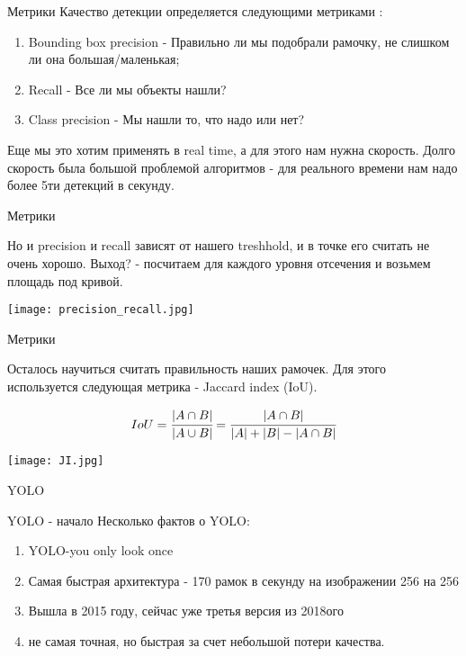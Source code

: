 \documentclass[notes,12pt, aspectratio=169]{beamer}
\newenvironment{transitionframe}{
  \setbeamercolor{background canvas}{bg=yellow}
  \begin{frame}}{
    \end{frame}
}
\begin{document}
\begin{frame}{Метрики}
Качество детекции определяется следующими метриками :
\begin{enumerate}
	\item Bounding box precision - Правильно ли мы подобрали рамочку, не слишком ли она большая/маленькая;
	\item Recall - Все ли мы объекты нашли?
	\item Class precision -  Мы нашли то, что надо или нет?
\end{enumerate}

Еще мы это хотим применять в real time, а для этого нам нужна скорость. Долго скорость была большой проблемой алгоритмов - для реального времени нам надо более 5ти детекций в секунду.
\end{frame}

\begin{frame}{Метрики}

Но и precision и recall зависят от нашего treshhold, и в точке его считать не очень хорошо. Выход? - посчитаем для каждого уровня отсечения и возьмем площадь под кривой.
\begin{center}
\texttt{[image: precision\_recall.jpg]}
\end{center}

\end{frame}

\begin{frame}{Метрики}
	
Осталось научиться считать правильность наших рамочек. Для этого используется следующая метрика - Jaccard index (IoU).

\begin{equation}
	IoU = \cfrac{|A \cap B|}{|A \cup B|} = \cfrac{|A \cap B|}{|A|+|B| - |A \cap B|}
\end{equation}

\begin{center}
	\texttt{[image: JI.jpg]}
\end{center}

\end{frame}


 \begin{transitionframe}
	\begin{center}
		\Huge  YOLO
	\end{center}
\end{transitionframe}


\begin{frame}{YOLO - начало}
	Несколько фактов о YOLO:
	\begin{enumerate}
		\item YOLO-you only look once
		\item Самая быстрая архитектура - 170 рамок в секунду на изображении 256 на 256
		\item Вышла в 2015 году, сейчас уже третья версия из 2018ого
		\item не самая точная, но быстрая за счет небольшой потери качества.
	\end{enumerate}
\end{frame}
\end{document}
